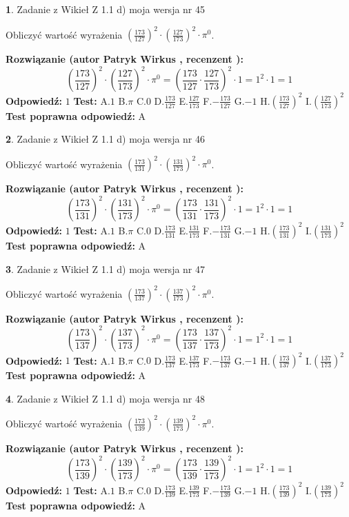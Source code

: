 \documentclass[12pt, a4paper]{article}
\theoremstyle{definition} %
\newtheorem{zad}{}
\newcommand{\zadStart}[1]{\begin{zad}#1\newline}
\newcommand{\zadStop}{\end{zad}}
\newcommand{\rozwStart}[2]{\noindent \textbf{Rozwiązanie (autor #1 , recenzent #2): }\newline}
\newcommand{\rozwStop}{\newline}
\newcommand{\odpStart}{\noindent \textbf{Odpowiedź:}\newline}
\newcommand{\odpStop}{\newline}
\newcommand{\testStart}{\noindent \textbf{Test:}\newline}
\newcommand{\testStop}{\newline}
\newcommand{\kluczStart}{\noindent \textbf{Test poprawna odpowiedź:}\newline}
\newcommand{\kluczStop}{\newline}
\begin{document}
\zadStart{Zadanie z Wikieł Z 1.1 d) moja wersja nr 45}

Obliczyć wartość wyrażenia $(\frac{173}{127})^{2} \cdot (\frac{127}{173})^{2} \cdot \pi^{0}$.
\zadStop
\rozwStart{Patryk Wirkus}{}
$$(\frac{173}{127})^{2} \cdot (\frac{127}{173})^{2} \cdot \pi^{0} = (\frac{173}{127} \cdot \frac{127}{173})^{2} \cdot 1 = 1^{2} \cdot 1 = 1$$
\rozwStop
\odpStart
$1$
\odpStop
\testStart
A.$1$ B.$\pi$ C.$0$ D.$\frac{173}{127}$ E.$\frac{127}{173}$
F.$-\frac{173}{127}$ G.$-1$
H.$(\frac{173}{127})^{2}$
I.$(\frac{127}{173})^{2}$
\testStop
\kluczStart
A
\kluczStop



\zadStart{Zadanie z Wikieł Z 1.1 d) moja wersja nr 46}

Obliczyć wartość wyrażenia $(\frac{173}{131})^{2} \cdot (\frac{131}{173})^{2} \cdot \pi^{0}$.
\zadStop
\rozwStart{Patryk Wirkus}{}
$$(\frac{173}{131})^{2} \cdot (\frac{131}{173})^{2} \cdot \pi^{0} = (\frac{173}{131} \cdot \frac{131}{173})^{2} \cdot 1 = 1^{2} \cdot 1 = 1$$
\rozwStop
\odpStart
$1$
\odpStop
\testStart
A.$1$ B.$\pi$ C.$0$ D.$\frac{173}{131}$ E.$\frac{131}{173}$
F.$-\frac{173}{131}$ G.$-1$
H.$(\frac{173}{131})^{2}$
I.$(\frac{131}{173})^{2}$
\testStop
\kluczStart
A
\kluczStop



\zadStart{Zadanie z Wikieł Z 1.1 d) moja wersja nr 47}

Obliczyć wartość wyrażenia $(\frac{173}{137})^{2} \cdot (\frac{137}{173})^{2} \cdot \pi^{0}$.
\zadStop
\rozwStart{Patryk Wirkus}{}
$$(\frac{173}{137})^{2} \cdot (\frac{137}{173})^{2} \cdot \pi^{0} = (\frac{173}{137} \cdot \frac{137}{173})^{2} \cdot 1 = 1^{2} \cdot 1 = 1$$
\rozwStop
\odpStart
$1$
\odpStop
\testStart
A.$1$ B.$\pi$ C.$0$ D.$\frac{173}{137}$ E.$\frac{137}{173}$
F.$-\frac{173}{137}$ G.$-1$
H.$(\frac{173}{137})^{2}$
I.$(\frac{137}{173})^{2}$
\testStop
\kluczStart
A
\kluczStop



\zadStart{Zadanie z Wikieł Z 1.1 d) moja wersja nr 48}

Obliczyć wartość wyrażenia $(\frac{173}{139})^{2} \cdot (\frac{139}{173})^{2} \cdot \pi^{0}$.
\zadStop
\rozwStart{Patryk Wirkus}{}
$$(\frac{173}{139})^{2} \cdot (\frac{139}{173})^{2} \cdot \pi^{0} = (\frac{173}{139} \cdot \frac{139}{173})^{2} \cdot 1 = 1^{2} \cdot 1 = 1$$
\rozwStop
\odpStart
$1$
\odpStop
\testStart
A.$1$ B.$\pi$ C.$0$ D.$\frac{173}{139}$ E.$\frac{139}{173}$
F.$-\frac{173}{139}$ G.$-1$
H.$(\frac{173}{139})^{2}$
I.$(\frac{139}{173})^{2}$
\testStop
\kluczStart
A
\kluczStop
\end{document}
